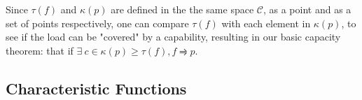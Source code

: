 Since $\tau(f)$ and $\kappa(p)$ are defined in the the same space $\mathcal{C}$, as a point and as a set of points respectively, one can compare $\tau(f)$ with each element in $\kappa(p)$, to see if the load can be "covered" by a capability, resulting in our basic capacity theorem: that if $\exists\ c \in \kappa(p) \geq \tau(f), f \rightrightharpoons p$.


\subsection{Characteristic Functions}






